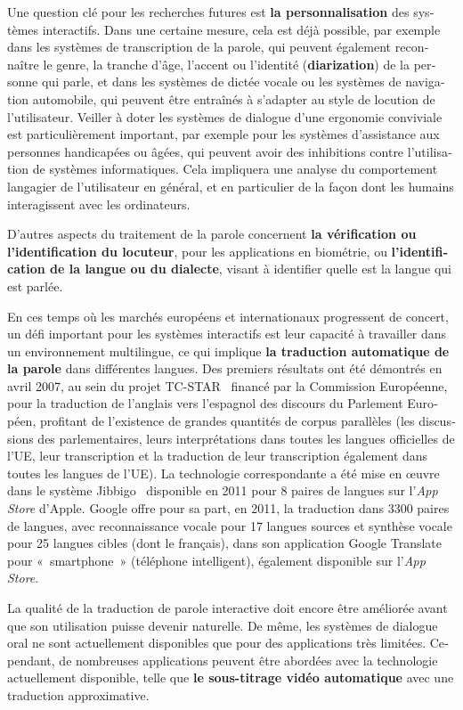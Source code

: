 \begin{french}
\begin{multicols}{2}
Une question clé pour les recherches futures est {\bf la personnalisation}
des systèmes interactifs. Dans une certaine mesure, cela est déjà
possible, par exemple dans les systèmes de transcription de la parole,
qui peuvent également reconnaître le genre, la tranche d'âge, l'accent
ou l'identité ({\bf diarization}) de la personne qui parle, et dans les
systèmes de dictée vocale ou les systèmes de navigation automobile,
qui peuvent être entraînés à s'adapter au style de locution de
l'utilisateur. Veiller à doter les systèmes de dialogue d'une ergonomie
conviviale est particulièrement important, par exemple pour les systèmes
d'assistance aux personnes handicapées ou âgées, qui peuvent avoir des
inhibitions contre l'utilisation de systèmes informatiques. Cela
impliquera une analyse du comportement langagier de l'utilisateur en
général, et en particulier de la façon dont les humains interagissent
avec les ordinateurs.

D'autres aspects du traitement de la parole concernent {\bf la vérification
ou l'identification du locuteur}, pour les applications en biométrie,
ou {\bf l'identification de la langue ou du dialecte}, visant à identifier
quelle est la langue qui est parlée.

En ces temps où les marchés européens et internationaux progressent de
concert, un défi important pour les systèmes interactifs est leur
capacité à travailler dans un environnement multilingue, ce qui
implique {\bf la traduction automatique de la parole} dans différentes
langues. Des premiers résultats ont été démontrés en avril 2007, au
sein du projet TC-STAR~\cite{tcstarurl} financé par la Commission
Européenne, pour la traduction de l'anglais vers l'espagnol des discours du Parlement Européen, profitant de l'existence de grandes quantités de corpus parallèles (les
discussions des parlementaires, leurs interprétations dans toutes les
langues officielles de l'UE, leur transcription et la
traduction de leur transcription également dans toutes les langues de
l'UE). La technologie correspondante a été mise en œuvre dans
le système Jibbigo~\cite{jibbigo} disponible en 2011 pour 8 paires de langues
sur l'{\em {\mbox App Store}} d'Apple. Google offre
pour sa part, en 2011, la traduction dans 3300 paires de langues, avec
reconnaissance vocale pour 17 langues sources et synthèse vocale pour
25 langues cibles (dont le français), dans son application Google
Translate pour «~smartphone~» (téléphone intelligent), également
disponible sur l'{\em {\mbox App Store}}.

La qualité de la traduction de parole interactive doit encore être
améliorée avant que son utilisation puisse devenir naturelle. De même,
les systèmes de dialogue oral ne sont actuellement disponibles que
pour des applications très limitées. Cependant, de nombreuses
applications peuvent être abordées avec la technologie actuellement
disponible, telle que {\bf le sous-titrage vidéo automatique} avec une
traduction approximative.


\end{multicols}
\end{french}
